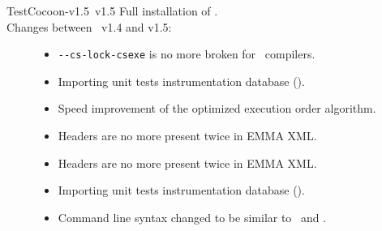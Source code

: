 \begin{TestCocoonDownload}
\begin{TestCocoonDownloadLink}
\end{TestCocoonDownloadLink}
\begin{ReleaseNote}{TestCocoon-v1.5}{\TestCocoon\ v1.5}
Full installation of \TestCocoon.\\
Changes between \TestCocoon\ v1.4 and v1.5:
\begin{description}
\item[\CoverageScanner]
  \begin{itemize}
    \item \BugFix \verb$--cs-lock-csexe$ is no more broken for \VisualStudio\ compilers.
  \end{itemize}
\item[\CoverageBrowser]
  \begin{itemize}
    \item \NewFeature Importing unit tests instrumentation database ().
    \item \NewFeature Speed improvement of the optimized execution order algorithm.
    \item \BugFix Headers are no more present twice in EMMA XML.
  \end{itemize}
\item[\cmreport]
  \begin{itemize}
    \item \BugFix Headers are no more present twice in EMMA XML.
  \end{itemize}
\item[\cmmerge]
  \begin{itemize}
    \item \NewFeature Importing unit tests instrumentation database ().
    \item Command line syntax changed to be similar to \cmreport\ and \cmcsexeimport.
  \end{itemize}
\end{description}
\end{ReleaseNote}
\end{TestCocoonDownload}


